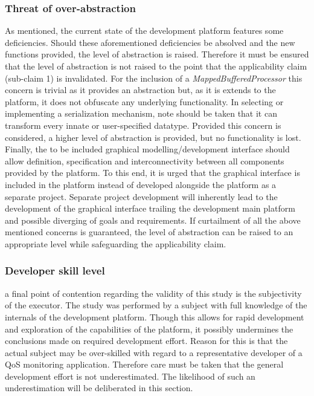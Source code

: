 \subsubsection{Threat of over-abstraction}
As mentioned, the current state of the development platform features some deficiencies. Should these aforementioned deficiencies be absolved and the new functions provided, the level of abstraction is raised. Therefore it must be ensured that the level of abstraction is not raised to the point that the applicability claim (sub-claim 1) is invalidated. For the inclusion of a \emph{MappedBufferedProcessor} this concern is trivial as it provides an abstraction but, as it is extends to the platform, it does not obfuscate any underlying functionality. In selecting or implementing a serialization mechanism, note should be taken that it can transform every innate or user-specified datatype. Provided this concern is considered, a higher level of abstraction is provided, but no functionality is lost. Finally, the to be included graphical modelling/development interface should allow definition, specification and interconnectivity between all components provided by the platform. To this end, it is urged that the graphical interface is included in the platform instead of developed alongside the platform as a separate project. Separate project development will inherently lead to the development of the graphical interface trailing the development main platform and possible diverging of goals and requirements. If curtailment of all the above mentioned concerns is guaranteed, the level of abstraction can be raised to an appropriate level while safeguarding the applicability claim.

\subsubsection{Developer skill level}
a final point of contention regarding the validity of this study is the subjectivity of the executor. The study was performed by a subject with full knowledge of the internals of the development platform. Though this allows for rapid development and exploration of the capabilities of the platform, it possibly undermines the conclusions made on required development effort. Reason for this is that the actual subject may be over-skilled with regard to a representative developer of a QoS monitoring application. Therefore care must be taken that the general development effort is not underestimated. The likelihood of such an underestimation will be deliberated in this section.

